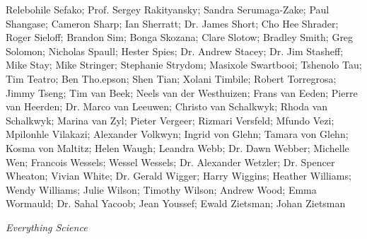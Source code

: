     Relebohile Sefako;
    Prof. Sergey Rakityansky;
    Sandra Serumaga-Zake;
    Paul Shangase;
    Cameron Sharp;
    Ian Sherratt;
Dr. James Short;
    Cho Hee Shrader;
    Roger Sieloff;
    Brandon Sim;
    Bonga Skozana;
    Clare Slotow;
    Bradley Smith;
    Greg Solomon;
    Nicholas Spaull;
    Hester Spies;
Dr. Andrew Stacey;
Dr. Jim Stasheff;
    Mike Stay;
    Mike Stringer;
    Stephanie Strydom;
    Masixole Swartbooi;
    Tshenolo Tau;
    Tim Teatro;
    Ben Tho.epson;
    Shen Tian;
    Xolani Timbile;
    Robert Torregrosa;
    Jimmy Tseng;
    Tim van Beek;
    Neels van der Westhuizen;
    Frans van Eeden;
    Pierre van Heerden;
Dr. Marco van Leeuwen;
    Christo van Schalkwyk;
    Rhoda van Schalkwyk;
    Marina van Zyl;
    Pieter Vergeer;
    Rizmari Versfeld;
    Mfundo Vezi;
    Mpilonhle Vilakazi;
    Alexander Volkwyn;
    Ingrid von Glehn;
    Tamara von Glehn;
    Kosma von Maltitz;
    Helen Waugh;
    Leandra Webb;
Dr. Dawn Webber;
    Michelle Wen;
    Francois Wessels;
    Wessel Wessels;
Dr. Alexander Wetzler;
Dr. Spencer Wheaton;
    Vivian White;
Dr. Gerald Wigger;
    Harry Wiggins;
    Heather Williams;
    Wendy Williams;
    Julie Wilson;
    Timothy Wilson;
    Andrew Wood;
    Emma Wormauld;
Dr. Sahal Yacoob;
    Jean Youssef;
    Ewald Zietsman;
    Johan Zietsman



\newpage
\thispagestyle{empty}

{\normalfont\sffamily\fontsize{22}\normalfont\itshape Everything Science} \par

